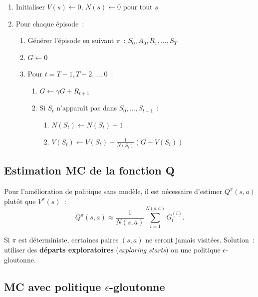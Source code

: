 \begin{algorithme}[title=\textbf{\'Evaluation MC premi\`ere visite}]
\begin{enumerate}
    \item Initialiser $V(s) \leftarrow 0$, $N(s) \leftarrow 0$ pour tout $s$
    \item Pour chaque \'episode~:
    \begin{enumerate}
        \item G\'en\'erer l'\'episode en suivant $\pi$~: $S_0, A_0, R_1, \ldots, S_T$
        \item $G \leftarrow 0$
        \item Pour $t = T-1, T-2, \ldots, 0$~:
        \begin{enumerate}
            \item $G \leftarrow \gamma G + R_{t+1}$
            \item Si $S_t$ n'appara\^it pas dans $S_0, \ldots, S_{t-1}$~:
            \begin{enumerate}
                \item $N(S_t) \leftarrow N(S_t) + 1$
                \item $V(S_t) \leftarrow V(S_t) + \frac{1}{N(S_t)}(G - V(S_t))$
            \end{enumerate}
        \end{enumerate}
    \end{enumerate}
\end{enumerate}
\end{algorithme}

\subsection{Estimation MC de la fonction Q}

Pour l'am\'elioration de politique sans mod\`ele, il est n\'ecessaire d'estimer
$Q^\pi(s,a)$ plut\^ot que $V^\pi(s)$~:
\[
    Q^\pi(s,a) \approx \frac{1}{N(s,a)} \sum_{i=1}^{N(s,a)} G_t^{(i)}.
\]

\begin{attention}[title=\textbf{Probl\`eme d'exploration}]
Si $\pi$ est d\'eterministe, certaines paires $(s,a)$ ne seront jamais
visit\'ees. Solution~: utiliser des \textbf{d\'eparts exploratoires}
(\emph{exploring starts}) ou une politique $\epsilon$-gloutonne.
\end{attention}

\subsection{MC avec politique $\epsilon$-gloutonne}


